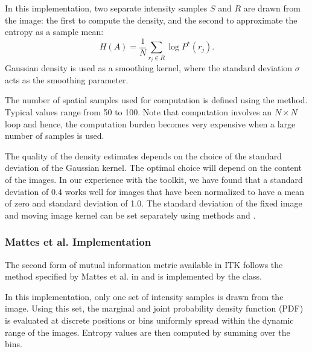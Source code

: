 
In this implementation, two separate intensity samples $S$ and $R$ are drawn
from the image: the first to compute the density, and the second to approximate
the entropy as a sample mean:
\begin{equation}
H(A) = \frac{1}{N} \sum_{r_j \in R} \log P^{*}(r_j).
\end{equation}
Gaussian density is used as a smoothing kernel, where the standard deviation
$\sigma$ acts as the smoothing parameter.


The number of spatial samples used for computation is defined using
the  method. Typical values range from 50 to 100.
Note that computation involves an $N \times N$ loop and hence, the computation
burden becomes very expensive when a large number of samples is used.

The quality of the density estimates depends on the choice of the standard
deviation of the Gaussian kernel. The optimal choice will depend on the
content of the images.  In our experience with the toolkit, we have found
that a standard deviation of 0.4 works well for images that have been
normalized to have a mean of zero and standard deviation of 1.0. The standard
deviation of the fixed image and moving image kernel can be set separately
using methods
 and .

\subsubsection{Mattes et al. Implementation}
The second form of mutual information metric available in ITK follows the
method specified by Mattes et al. in \cite{Mattes2001} and is implemented by
the  class.

In this implementation, only one set of intensity samples is drawn from the
image.  Using this set, the marginal and joint probability density function
(PDF) is evaluated at discrete positions or bins uniformly spread within the
dynamic range of the images. Entropy values are then computed by summing over
the bins.

